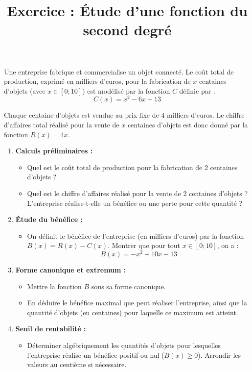 \documentclass[11pt,a4paper]{article}
\title{Exercice : Étude d'une fonction du second degré}
\author{}
\date{}
\begin{document}
\maketitle

Une entreprise fabrique et commercialise un objet connecté. Le coût total de production, exprimé en milliers d'euros, pour la fabrication de $x$ centaines d'objets (avec $x \in [0 ; 10]$) est modélisé par la fonction $C$ définie par :
\[C(x) = x^2 - 6x + 13\]

Chaque centaine d'objets est vendue au prix fixe de $4$ milliers d'euros. Le chiffre d'affaires total réalisé pour la vente de $x$ centaines d'objets est donc donné par la fonction $R(x) = 4x$.

\begin{enumerate}
    \item \textbf{Calculs préliminaires :}
    \begin{itemize}
        \item Quel est le coût total de production pour la fabrication de $2$ centaines d'objets ?
        \item Quel est le chiffre d'affaires réalisé pour la vente de $2$ centaines d'objets ? L'entreprise réalise-t-elle un bénéfice ou une perte pour cette quantité ?
    \end{itemize}

    \item \textbf{Étude du bénéfice :}
    \begin{itemize}
        \item On définit le bénéfice de l'entreprise (en milliers d'euros) par la fonction $B(x) = R(x) - C(x)$. Montrer que pour tout $x \in [0 ; 10]$, on a :
        \[B(x) = -x^2 + 10x - 13\]
    \end{itemize}

    \item \textbf{Forme canonique et extremum :}
    \begin{itemize}
        \item Mettre la fonction $B$ sous sa forme canonique.
        \item En déduire le bénéfice maximal que peut réaliser l'entreprise, ainsi que la quantité d'objets (en centaines) pour laquelle ce maximum est atteint.
    \end{itemize}

    \item \textbf{Seuil de rentabilité :}
    \begin{itemize}
        \item Déterminer algébriquement les quantités d'objets pour lesquelles l'entreprise réalise un bénéfice positif ou nul ($B(x) \ge 0$). Arrondir les valeurs au centième si nécessaire.
    \end{itemize}
\end{enumerate}
\end{document}
